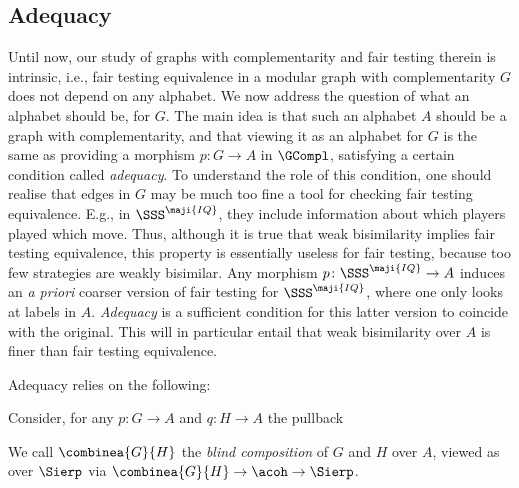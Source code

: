 \documentclass{LMCS}
\renewcommand{\QFI}{\maji{IQ}}
\renewcommand{\LLL}{\QFI}
\renewcommand{\SSSL}{\SSS^{\LLL}}
\theoremstyle{plain}\newtheorem{satz}[thm]{Satz}
\begin{document}
\subsection{Adequacy}
Until now, our study of graphs with complementarity and fair testing
therein is intrinsic, i.e., fair testing equivalence in a modular
graph with complementarity $G$ does not depend on any alphabet.  We
now address the question of what an alphabet should be, for $G$. The
main idea is that such an alphabet $A$ should be a graph with
complementarity, and that viewing it as an alphabet for $G$ is the
same as providing a morphism $p \colon G \to A$ in $\GCompl$, satisfying
a certain condition called \emph{adequacy}. To understand the role of
this condition, one should realise that edges in $G$ may be much too
fine a tool for checking fair testing equivalence. E.g., in $\SSSL$,
they include information about which players played which move.  Thus,
although it is true that weak bisimilarity implies fair testing
equivalence, this property is essentially useless for fair testing,
because too few strategies are weakly bisimilar.  Any morphism $p
\colon \SSSL \to A$ induces an \emph{a priori} coarser version of fair
testing for $\SSSL$, where one only looks at labels in $A$.
\emph{Adequacy} is a sufficient condition for this latter version to
coincide with the original. This will in particular entail that weak
bisimilarity over $A$ is finer than fair testing equivalence.

Adequacy relies on the following:
\begin{defi}
  Consider, for any $p \colon G \to A$ and $q \colon H \to A$ the pullback
    \begin{center}
    \end{center}
    We call $\combinea{G}{H}$ the \emph{blind composition} of $G$ and
    $H$ over $A$, viewed as \anlts{} over $\Sierp$ via
    $\combinea{G}{H} \to \acoh \to \Sierp$.
\end{defi}
\end{document}
